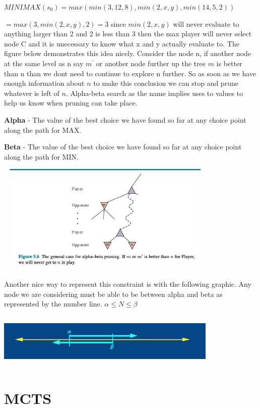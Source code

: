 $ MINIMAX(s_{0}) = max(min(3,12,8), min(2,x,y), min(14,5,2)) $

$ = max(3,min(2,x,y),2) = 3 $ since $ min(2,x,y)$ will never evaluate to anything larger than 2 and 2 is less than 3 then the max player will never select node C and it is unecessary to know what x and y actually evaluate to. The figure below demonstrates this idea nicely. Consider the node n, if another node at the same level as n say $ m^{'}$ or another node further up the tree $m$ is better than n than we dont need to continue to explore n further. So as soon as we have enough information about $n$ to make this conclusion we can stop and prune whatever is left of $n$. Alpha-beta search as the name implies uses to values to help us know when pruning can take place.

\textbf{Alpha} - The value of the best choice we have found so far at any choice point along the path for MAX. 

\textbf{Beta} - The value of the best choice we have found so far at any choice point along the path for MIN. 

\includegraphics[width=400px,height=200px]{images/AI_figure_5_6.png}

Another nice way to represent this constraint is with the following graphic. Any node we are considering must be able to be between alpha and beta as represented by the number line. $ \alpha \leq N \leq \beta $

\includegraphics[width=400px,height=100px]{images/alpha_beta_number_line.png}

\section{MCTS}

